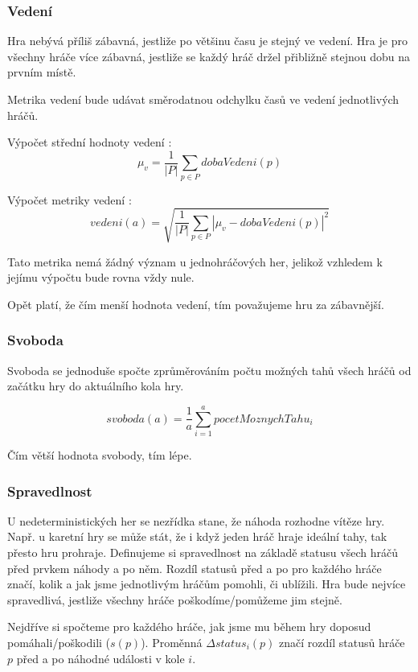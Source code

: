 \subsubsection{Vedení}

Hra nebývá příliš zábavná, jestliže po většinu času je stejný ve vedení. Hra je pro všechny hráče více zábavná, jestliže se každý hráč držel přibližně stejnou dobu na prvním místě.

Metrika vedení bude udávat směrodatnou odchylku časů ve vedení jednotlivých hráčů.

Výpočet střední hodnoty vedení :
	\[
	\mu_v = \frac{1}{|P|}\sum_{p \in P} dobaVedeni(p)
\]

Výpočet metriky vedení :
	\[
	vedeni(a) = \sqrt{\frac{1}{|P|}\sum_{p \in P} |\mu_v - dobaVedeni(p)|^2}
\]

Tato metrika nemá žádný význam u jednohráčových her, jelikož vzhledem k jejímu výpočtu bude rovna vždy nule.

Opět platí, že čím menší hodnota vedení, tím považujeme hru za zábavnější.

\subsubsection{Svoboda}

Svoboda se jednoduše spočte zprůměrováním počtu možných tahů všech hráčů od začátku hry do aktuálního kola hry.

\[
	svoboda(a) = \frac{1}{a}\sum_{i=1}^a{pocetMoznychTahu_i}
\]

Čím větší hodnota svobody, tím lépe.

\subsubsection{Spravedlnost}

U nedeterministických her se nezřídka stane, že náhoda rozhodne vítěze hry. Např. u karetní hry se může stát, že i když jeden hráč hraje ideální tahy, tak přesto hru prohraje. Definujeme si spravedlnost na základě statusu všech hráčů před prvkem náhody a po něm. Rozdíl statusů před a po pro každého hráče značí, kolik a jak jsme jednotlivým hráčům pomohli, či ublížili. Hra bude nejvíce spravedlivá, jestliže všechny hráče poškodíme/pomůžeme jim stejně.

Nejdříve si spočteme pro každého hráče, jak jsme mu během hry doposud pomáhali/poškodili ($s(p)$). Proměnná $\Delta status_i(p)$ značí rozdíl statusů hráče $p$ před a po náhodné události v kole $i$.

